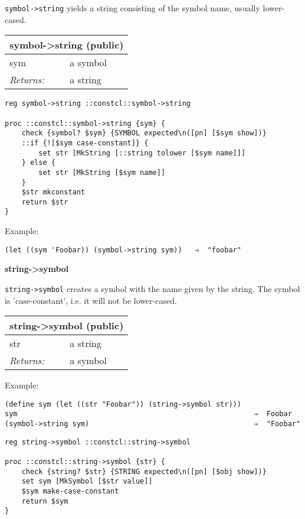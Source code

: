 \documentclass{report}
\begin{document}
\texttt{symbol->string} yields a string consisting of the symbol name, usually lower-cased.

\begin{tabular}{ |l l| }
\hline
\multicolumn{2}{|l|}{symbol->string (public)} \\
\hline
sym & a symbol \\
\textit{Returns:} & a string \\
\hline
\end{tabular}

\noindent\makebox[\linewidth]{\rule{\linewidth}{0.4pt}}
\begin{lstlisting}
reg symbol->string ::constcl::symbol->string
 
proc ::constcl::symbol->string {sym} {
    check {symbol? $sym} {SYMBOL expected\n([pn] [$sym show])}
    ::if {![$sym case-constant]} {
        set str [MkString [::string tolower [$sym name]]]
    } else {
        set str [MkString [$sym name]]
    }
    $str mkconstant
    return $str
}
\end{lstlisting}
\noindent\makebox[\linewidth]{\rule{\linewidth}{0.4pt}}

Example:

\noindent\makebox[\linewidth]{\rule{\linewidth}{0.4pt}}
\begin{lstlisting}
(let ((sym 'Foobar)) (symbol->string sym))   ⇒  "foobar"
\end{lstlisting}
\noindent\makebox[\linewidth]{\rule{\linewidth}{0.4pt}}

\textbf{string->symbol}


\texttt{string->symbol} creates a symbol with the name given by the string. The symbol is 'case-constant', i.e. it will not be lower-cased.

\begin{tabular}{ |l l| }
\hline
\multicolumn{2}{|l|}{string->symbol (public)} \\
\hline
str & a string \\
\textit{Returns:} & a symbol \\
\hline
\end{tabular}


Example:

\noindent\makebox[\linewidth]{\rule{\linewidth}{0.4pt}}
\begin{lstlisting}
(define sym (let ((str "Foobar")) (string->symbol str)))
sym                                                        ⇒  Foobar
(symbol->string sym)                                       ⇒  "Foobar"
\end{lstlisting}
\noindent\makebox[\linewidth]{\rule{\linewidth}{0.4pt}}
\noindent\makebox[\linewidth]{\rule{\linewidth}{0.4pt}}
\begin{lstlisting}
reg string->symbol ::constcl::string->symbol
 
proc ::constcl::string->symbol {str} {
    check {string? $str} {STRING expected\n([pn] [$obj show])}
    set sym [MkSymbol [$str value]]
    $sym make-case-constant
    return $sym
}
\end{lstlisting}
\noindent\makebox[\linewidth]{\rule{\linewidth}{0.4pt}}
\end{document}
